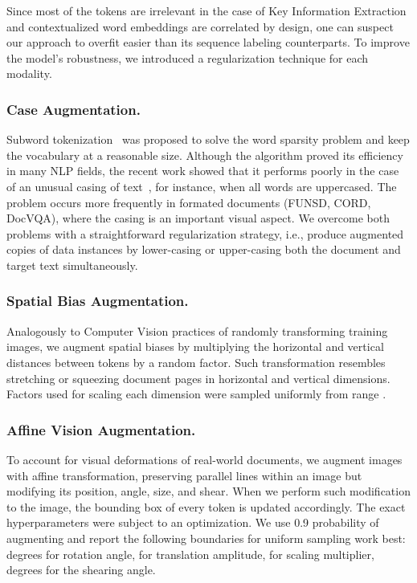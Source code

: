 \documentclass[runningheads]{llncs}
\begin{document}
Since most of the tokens are irrelevant in the case of Key Information Extraction and contextualized word embeddings are correlated by design, one can suspect our approach to overfit easier than its sequence labeling counterparts. To improve the model's robustness, we introduced a regularization technique for each modality.

\subsubsection{Case Augmentation.}
Subword tokenization~\cite{sennrich-etal-2016-neural,kudo-2018-subword} was proposed to solve the word sparsity problem and keep the vocabulary at a reasonable size. 
Although the algorithm proved its efficiency in many NLP fields, the recent work showed that it performs poorly in the case of an unusual casing of text~\cite{powalski2020unicase}, for instance, when all words are uppercased. The problem occurs more frequently in formated documents (FUNSD, CORD, DocVQA), where the casing is an important visual aspect.
We overcome both problems with a straightforward regularization strategy, i.e., produce augmented copies of data instances by lower-casing or upper-casing both the document and target text simultaneously.





\subsubsection{Spatial Bias Augmentation.}
Analogously to Computer Vision practices of randomly transforming training images, we augment spatial biases by multiplying the horizontal and vertical distances between tokens by a random factor. Such transformation resembles stretching or squeezing document pages in horizontal and vertical dimensions. Factors used for scaling each dimension were sampled uniformly from range .

\subsubsection{Affine Vision Augmentation.}
To account for visual deformations of real-world documents, we augment images with affine transformation, preserving parallel lines within an image but modifying its position, angle, size, and shear. When we perform such modification to the image, the bounding box of every token is updated accordingly.
The exact hyperparameters were subject to an optimization. We use 0.9 probability of augmenting and report the following boundaries for uniform sampling work best:  degrees for rotation angle,  for translation amplitude,  for scaling multiplier,  degrees for the shearing angle.
\end{document}
